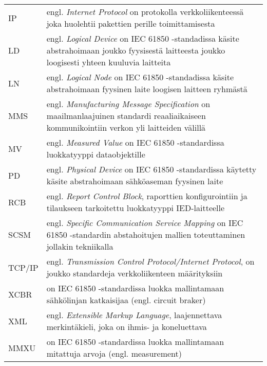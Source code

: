 \begin{tabular}[h]{@{} p{} p{} @{}}
	IP & engl. \emph{Internet Protocol} on protokolla verkkoliikenteessä joka huolehtii pakettien perille toimittamisesta \\
	LD & engl. \emph{Logical Device} on IEC 61850 -standadissa käsite abstrahoimaan joukko fyysisestä laitteesta joukko loogisesti yhteen kuuluvia laitteita \\
	LN & engl. \emph{Logical Node} on IEC 61850 -standadissa käsite abstrahoimaan fyysinen laite loogisen laitteen ryhmästä \\
	MMS & engl. \emph{Manufacturing Message Specification} on maailmanlaajuinen standardi reaaliaikaiseen kommunikointiin verkon yli laitteiden välillä \\
	MV & engl. \emph{Measured Value} on IEC 61850 -standardissa luokkatyyppi dataobjektille \\
	PD & engl. \emph{Physical Device} on IEC 61850 -standardissa käytetty käsite abstrahoimaan sähköaseman fyysinen laite \\
	RCB & engl. \emph{Report Control Block}, raporttien konfigurointiin ja tilaukseen tarkoitettu luokkatyyppi IED-laitteelle \\
	SCSM & engl. \emph{Specific Communication Service Mapping} on IEC 61850 -standardin abstahoitujen mallien toteuttaminen jollakin tekniikalla \\
	TCP/IP & engl. \emph{Transmission Control Protocol/Internet Protocol}, on joukko standardeja verkkoliikenteen määrityksiin \\
	XCBR & on IEC 61850 -standardissa luokka mallintamaan sähkölinjan katkaisijaa (engl. circuit braker) \\
	XML & engl. \emph{Extensible Markup Language}, laajennettava merkintäkieli, joka on ihmis- ja koneluettava \\
	MMXU & on IEC 61850 -standardissa luokka mallintamaan mitattuja arvoja (engl. measurement) \\
\end{tabular}